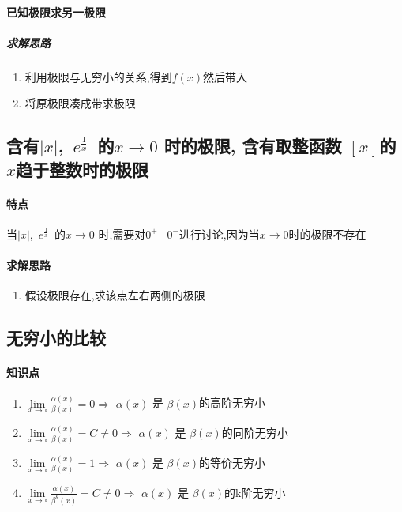     \paragraph{已知极限求另一极限}
    \subparagraph{求解思路}
    
    \begin{enumerate}
        \item 利用极限与无穷小的关系,得到$f(x)$然后带入
        \item 将原极限凑成带求极限
    \end{enumerate}
\subsection{含有$|x|$,\ $ e^{\frac{1}{x}}$\ 的$x \rightarrow 0$ 时的极限, 含有取整函数 $[x]$的$x$趋于整数时的极限}
    \paragraph{特点}
    当$|x|$,\ $ e^{\frac{1}{x}}$\ 的$x \rightarrow 0$ 时,需要对$0^+$ \ $0^-$进行讨论,因为当$x\rightarrow0$时的极限不存在
    \paragraph{求解思路}
    \begin{enumerate}
        \item  假设极限存在,求该点左右两侧的极限
    \end{enumerate}
\subsection{无穷小的比较}
    \paragraph{知识点}
    \begin{enumerate}
        \item $\lim\limits_{x\rightarrow \square}\frac{\alpha(x)}{\beta(x)} = 0 \Longrightarrow $ $\alpha(x)$ 是 $\beta(x)$的高阶无穷小 
        \item $\lim\limits_{x\rightarrow \square}\frac{\alpha(x)}{\beta(x)} = C \neq 0 \Longrightarrow $ $\alpha(x)$ 是 $\beta(x)$的同阶无穷小
        \item $\lim\limits_{x\rightarrow \square}\frac{\alpha(x)}{\beta(x)} = 1 \Longrightarrow $ $\alpha(x)$ 是 $\beta(x)$的等价无穷小 
        \item $\lim\limits_{x\rightarrow \square}\frac{\alpha(x)}{\beta^k(x)} = C \neq 0 \Longrightarrow $ $\alpha(x)$ 是 $\beta(x)$的k阶无穷小  
    \end{enumerate}
